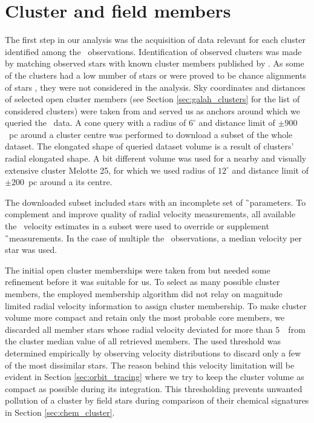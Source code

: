 \section{Cluster and field members}
\label{sec:membership_v2}
The first step in our analysis was the acquisition of data relevant for each cluster identified among the \Gh\ observations. Identification of observed clusters was made by matching observed stars with known cluster members published by \citet{2018A&A...618A..93C}. As some of the clusters had a low number of stars or were proved to be chance alignments of stars \cite{2018MNRAS.480.5242K}, they were not considered in the analysis. Sky coordinates and distances of selected open cluster members (see Section \ref{sec:galah_clusters} for the list of considered clusters) were taken from \citet{2018A&A...618A..93C} and served us as anchors around which we queried the \Gs\ data. A cone query with a radius of $6^\circ$ and distance limit of $\pm900$~pc around a cluster centre was performed to download a subset of the whole dataset. The elongated shape of queried dataset volume is a result of clusters' radial elongated shape. A bit different volume was used for a nearby and visually extensive cluster Melotte 25, for which we used radius of $12^\circ$ and distance limit of $\pm200$~pc around a its centre. 

The downloaded subset included stars with an incomplete set of \G\ parameters. To complement and improve quality of radial velocity measurements, all available the \Gh\ velocity estimates in a subset were used to override or supplement \G\ measurements. In the case of multiple the \Gh\ observations, a median velocity per star was used. 

The initial open cluster memberships were taken from \citet{2018A&A...618A..93C} but needed some refinement before it was suitable for us. To select as many possible cluster members, the employed membership algorithm did not relay on magnitude limited radial velocity information to assign cluster membership. To make cluster volume more compact and retain only the most probable core members, we discarded all member stars whose radial velocity deviated for more than $5$~\kms\ from the cluster median value of all retrieved members. The used threshold was determined empirically by observing velocity distributions to discard only a few of the most dissimilar stars. The reason behind this velocity limitation will be evident in Section \ref{sec:orbit_tracing} where we try to keep the cluster volume as compact as possible during its integration. This thresholding prevents unwanted pollution of a cluster by field stars during comparison of their chemical signatures in Section \ref{sec:chem_cluster}. 

